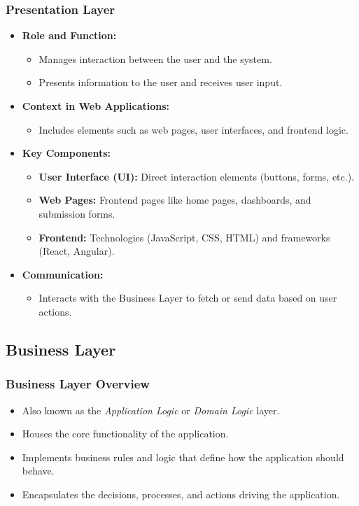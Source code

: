\documentclass[aspectratio=169, table]{beamer}
\begin{document}
\begin{frame}
	\frametitle{Presentation Layer}
	\begin{itemize}
		\item \textbf{Role and Function:}
		\begin{itemize}
			\item Manages interaction between the user and the system.
			\item Presents information to the user and receives user input.
		\end{itemize}
		\item \textbf{Context in Web Applications:}
		\begin{itemize}
			\item Includes elements such as web pages, user interfaces, and frontend logic.
		\end{itemize}
		\item \textbf{Key Components:}
		\begin{itemize}
			\item \textbf{User Interface (UI):} Direct interaction elements (buttons, forms, etc.).
			\item \textbf{Web Pages:} Frontend pages like home pages, dashboards, and submission forms.
			\item \textbf{Frontend:} Technologies (JavaScript, CSS, HTML) and frameworks (React, Angular).
		\end{itemize}
		\item \textbf{Communication:}
		\begin{itemize}
			\item Interacts with the Business Layer to fetch or send data based on user actions.
		\end{itemize}
	\end{itemize}
\end{frame}


\subsection{Business Layer}

\begin{frame}
	\frametitle{Business Layer Overview}
	\begin{itemize}
		\item Also known as the \textit{Application Logic} or \textit{Domain Logic} layer.
		\item Houses the core functionality of the application.
		\item Implements business rules and logic that define how the application should behave.
		\item Encapsulates the decisions, processes, and actions driving the application.
	\end{itemize}
\end{frame}
\end{document}

